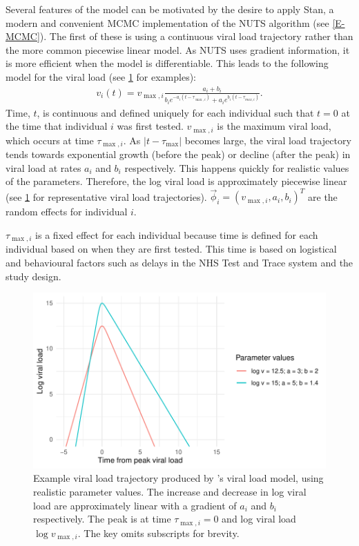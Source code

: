 \documentclass[thesis.tex]{subfiles}
\begin{document}
Several features of the \textcite{hakkiOnset} model can be motivated by the desire to apply Stan, a modern and convenient MCMC implementation of the NUTS algorithm (see \cref{E-MCMC}).
The first of these is using a continuous viral load trajectory rather than the more common piecewise linear model.
As NUTS uses gradient information, it is more efficient when the model is differentiable.
This leads to the following model for the viral load (see \cref{ATACCC:fig:viral-load-model} for examples):
\begin{align}
v_i(t) = v_{\max,i} \frac{a_i+b_i}{b_ie^{-a_i(t-\tau_{\max,i})} + a_ie^{b_i(t-\tau_{max,i})}}. \label{ATACCC:eq:viral-load}
\end{align}
Time, $t$, is continuous and defined uniquely for each individual such that $t = 0$ at the time that individual $i$ was first tested.
$v_{\max,i}$ is the maximum viral load, which occurs at time $\tau_{\max,i}$.
As $\lvert t - \tau_{\max} \rvert$ becomes large, the viral load trajectory tends towards exponential growth (before the peak) or decline (after the peak) in viral load at rates $a_i$ and $b_i$ respectively.
This happens quickly for realistic values of the parameters.
Therefore, the log viral load is approximately piecewise linear (see \cref{ATACCC:fig:viral-load-model} for representative viral load trajectories).
$\vec{\phi}_i = (v_{\max,i}, a_i, b_i)^T$ are the random effects for individual $i$.

$\tau_{\max,i}$ is a fixed effect for each individual because time is defined for each individual based on when they are first tested.
This time is based on logistical and behavioural factors such as delays in the NHS Test and Trace system and the study design.
\begin{figure}[tbhp]
  \centering \includegraphics{ATACCC/typical_trajectory}
  \caption[Example viral load model trajectory.]{%
    Example viral load trajectory produced by \textcite{hakkiOnset}'s viral load model, using realistic parameter values.
    The increase and decrease in log viral load are approximately linear with a gradient of $a_i$ and $b_i$ respectively.
    The peak is at time $\tau_{\max,i} = 0$ and log viral load $\log v_{\max,i}$.
    The key omits subscripts for brevity.
  }
  \label{ATACCC:fig:viral-load-model}
\end{figure}
\end{document}
